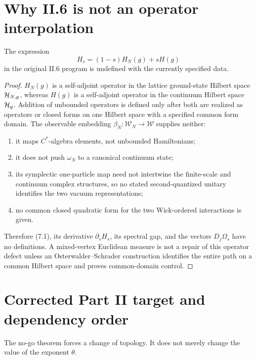 \documentclass[11pt,a4paper]{article}
\newcommand{\W}{\mathcal W}
\begin{document}
\section{Why II.6 is not an operator interpolation}\label{sec:interpolation}

\begin{proposition}\label{prop:path}
The expression
\[
 H_s=(1-s)H_N(g)+sH(g)                                          \tag{7.1}
\]
in the original II.6 program is undefined with the currently specified data.
\end{proposition}

\begin{proof}
$H_N(g)$ is a self-adjoint operator in the lattice ground-state Hilbert space
$\mathcal H_{N,g}$, whereas $H(g)$ is a self-adjoint operator in the continuum Hilbert space
$\mathcal H_g$.  Addition of unbounded operators is defined only after both are realized as
operators or closed forms on one Hilbert space with a specified common form domain.
The observable embedding $\beta_N:\W_N\to\W$ supplies neither:
\begin{enumerate}[label=\textup{(\alph*)}]
\item it maps $C^*$-algebra elements, not unbounded Hamiltonians;
\item it does not push $\omega_N$ to a canonical continuum state;
\item its symplectic one-particle map need not intertwine the finite-scale and continuum
complex structures, so no stated second-quantized unitary identifies the two vacuum
representations;
\item no common closed quadratic form for the two Wick-ordered interactions is given.
\end{enumerate}
Therefore (7.1), its derivative $\partial_sH_s$, its spectral gap, and the vectors
$D_j\Omega_s$ have no definitions.  A mixed-vertex Euclidean measure is not a repair of
this operator defect unless an Osterwalder--Schrader construction identifies the entire
path on a common Hilbert space and proves common-domain control.
\end{proof}

\section{Corrected Part II target and dependency order}\label{sec:repair}

The no-go theorem forces a change of topology.  It does not merely change the value of
the exponent $\theta$.
\end{document}
